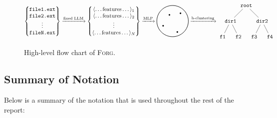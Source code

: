 \documentclass{article}
\begin{document}
\begin{figure}[H]
  \begin{align*}
    \begin{Bmatrix}
      \texttt{file1.ext} \\
      \texttt{file2.ext} \\
      \vdots             \\
      \texttt{fileN.ext}
    \end{Bmatrix}
    \xrightarrow{\text{fixed LLM}}
    \begin{Bmatrix}
      \langle \dots \text{features} \dots \rangle_1 \\
      \langle \dots \text{features} \dots \rangle_2 \\
      \vdots                                        \\
      \langle \dots \text{features} \dots \rangle_N
    \end{Bmatrix}
    \xrightarrow{\text{MLP}}
    \begin{tikzpicture}[baseline={(0,-0.1)}]
      \draw[thick] (0,0) circle (1);
      \fill (0.5,0.5) circle (0.05);
      \fill (-0.2,0.4) circle (0.05);
      \fill (0.3,-0.7) circle (0.05);
      \fill (-0.6,-0.3) circle (0.05);
    \end{tikzpicture}
    \xrightarrow{\text{h-clustering}}
    \begin{tikzpicture}[baseline={(0,-1.1)}]
      \node (root) at (0,0) {\texttt{root}};
      \node (dir1) at (-1,-1) {\texttt{dir1}};
      \node (dir2) at (1,-1) {\texttt{dir2}};
      \node (file1) at (-1.5,-2) {\texttt{f1}};
      \node (file2) at (-0.5,-2) {\texttt{f2}};
      \node (file3) at (0.5,-2) {\texttt{f3}};
      \node (file4) at (1.5,-2) {\texttt{f4}};
      \draw (root) -- (dir1);
      \draw (root) -- (dir2);
      \draw (dir1) -- (file1);
      \draw (dir1) -- (file2);
      \draw (dir2) -- (file3);
      \draw (dir2) -- (file4);
    \end{tikzpicture}
  \end{align*}
  \caption{High-level flow chart of \textsc{Forg}.}
\end{figure}

\subsection{Summary of Notation}

Below is a summary of the notation that is used throughout the rest of the report:
\end{document}

